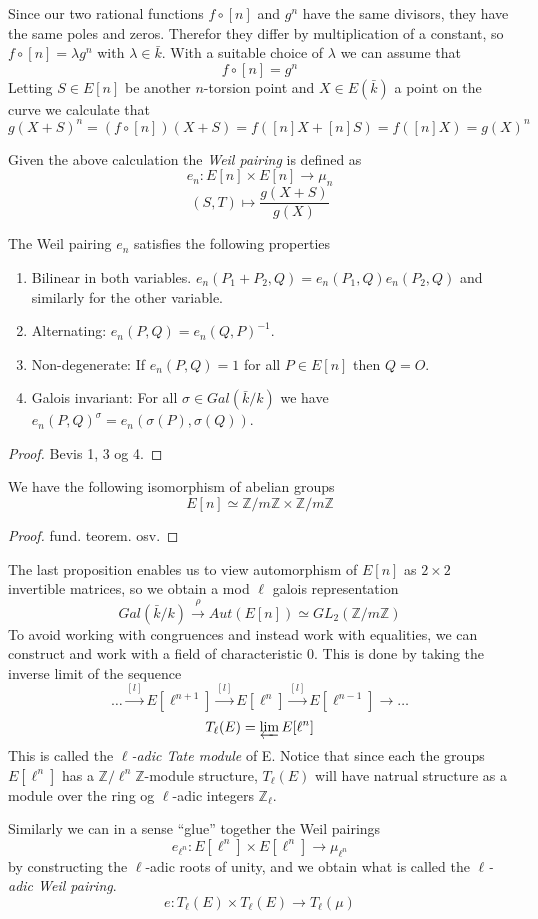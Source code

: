 Since our two rational functions $f \circ [n]$ and $g^n$ have the same divisors, they have the
same poles and zeros. Therefor they differ by multiplication of a constant, so
$f \circ [n] = \lambda g^n$ with $\lambda \in \bar{k}$. With a suitable choice of $\lambda$
we can assume that 
$$f \circ [n] = g^n$$
Letting $S \in E[n]$ be another $n$-torsion point and $X \in E(\bar{k})$ a point on the curve we calculate that
$$ g(X + S)^n = (f \circ [n])(X + S) = f([n]X + [n]S) = f([n]X) = g(X)^n $$
\begin{mydef}
 Given the above calculation the \emph{Weil pairing} is defined as
$$ e_n : E[n] \times E[n] \rightarrow \mu_n$$
$$ (S,T) \mapsto \frac{g(X + S)}{g(X)} $$
\end{mydef}

\begin{prop}
 The Weil pairing $e_n$ satisfies the following properties
\begin{enumerate}
 \item Bilinear in both variables. $e_n(P_1 + P_2, Q) = e_n(P_1,Q)e_n(P_2,Q)$ and similarly for the other variable.
 \item Alternating: $e_n(P,Q) = e_n(Q,P)^{-1}$.
 \item Non-degenerate: If $e_n(P,Q) = 1$ for all $P \in E[n]$ then $Q=O$.
 \item Galois invariant: For all $\sigma \in Gal(\bar{k}/k)$ we have $e_n(P,Q)^\sigma = e_n(\sigma(P),\sigma(Q))$.
\end{enumerate}
\end{prop}
\begin{proof}
 Bevis 1, 3 og 4.
\end{proof}

\begin{prop}
We have the following isomorphism of abelian groups
 $$ E[n] \simeq \mathbb{Z}/m\mathbb{Z} \times \mathbb{Z}/m\mathbb{Z} $$
\end{prop}
\begin{proof}
 fund. teorem. osv.
\end{proof}

The last proposition enables us to view automorphism of $E[n]$ as $2\times 2$ invertible matrices,
so we obtain a  mod $\ell$ galois representation
$$ Gal(\bar{k}/k) \overset{\rho}{\rightarrow} Aut(E[n]) \simeq GL_2(\mathbb{Z}/m\mathbb{Z}) $$
To avoid working with congruences and instead work with equalities, we can construct
and work with a field of characteristic 0. This is done by taking the inverse limit of the sequence
$$ \dots \overset{[l]}{\rightarrow} E[\ell^{n+1}] \overset{[l]}{\rightarrow} E[\ell^{n}] \overset{[l]}{\rightarrow} E[\ell^{n-1}] \rightarrow \ldots $$
$$ T_\ell(E) = \varprojlim E[\ell^n] $$
This is called the \emph{$\ell$-adic Tate module} of E. Notice that since each the groups $E[\ell^n]$ has a
$\mathbb{Z}/\ell^n\mathbb{Z}$-module structure, $T_\ell(E)$ will have natrual structure as a module
over the ring og $\ell$-adic integers $\mathbb{Z}_\ell$.

Similarly we can in a sense ``glue'' together the Weil pairings
$$ e_{\ell^n} : E[\ell^n] \times E[\ell^n] \rightarrow \mu_{\ell^n} $$
by constructing the $\ell$-adic roots of unity, and we obtain what is called the
\emph{$\ell$-adic Weil pairing}.
$$ e: T_\ell(E) \times T_\ell(E) \rightarrow T_\ell(\mu) $$
